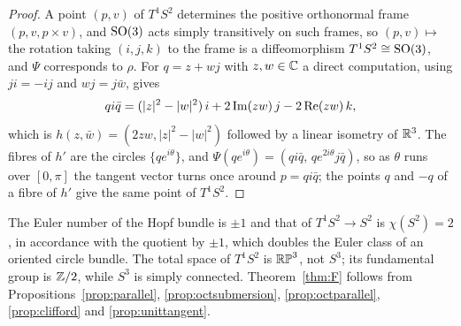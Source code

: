 \begin{proof}
A point $(p,v)$ of $T^1S^2$ determines the positive orthonormal frame $(p,v,p\times v)$, and $\mathrm{SO}(3)$ acts simply transitively on such frames, so $(p,v)\mapsto$ the rotation taking $(i,j,k)$ to the frame is a diffeomorphism $T^1S^2\cong\mathrm{SO}(3)$, and $\Psi$ corresponds to $\rho$. For $q=z+wj$ with $z,w\in\mathbb{C}$ a direct computation, using $ji=-ij$ and $wj=j\bar w$, gives
\[
qi\bar q=(|z|^2-|w|^2)\,i+2\operatorname{Im}(zw)\,j-2\operatorname{Re}(zw)\,k,
\]
which is $h(z,\bar w)=(2zw,|z|^2-|w|^2)$ followed by a linear isometry of $\mathbb{R}^3$. The fibres of $h'$ are the circles $\{qe^{i\theta}\}$, and $\Psi(qe^{i\theta})=(qi\bar q,\,qe^{2i\theta}j\bar q)$, so as $\theta$ runs over $[0,\pi]$ the tangent vector turns once around $p=qi\bar q$; the points $q$ and $-q$ of a fibre of $h'$ give the same point of $T^1S^2$.
\end{proof}

\begin{remark}
The Euler number of the Hopf bundle is $\pm1$ and that of $T^1S^2\to S^2$ is $\chi(S^2)=2$, in accordance with the quotient by $\pm1$, which doubles the Euler class of an oriented circle bundle. The total space of $T^1S^2$ is $\mathbb{RP}^3$, not $S^3$; its fundamental group is $\mathbb{Z}/2$, while $S^3$ is simply connected. Theorem~\ref{thm:F} follows from Propositions~\ref{prop:parallel}, \ref{prop:octsubmersion}, \ref{prop:octparallel}, \ref{prop:clifford} and \ref{prop:unittangent}.
\end{remark}
